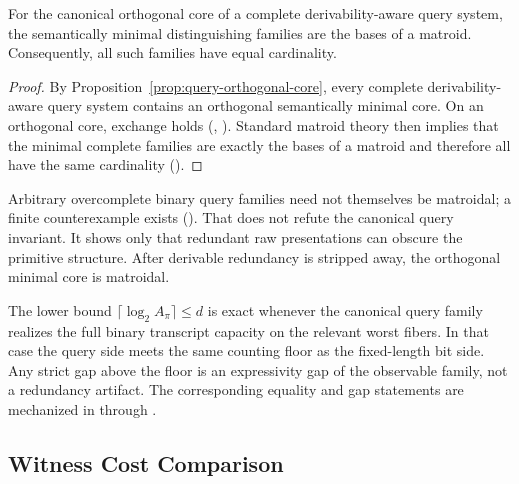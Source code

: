 \begin{theorem}\label{thm:matroid-bases}
For the canonical orthogonal core of a complete derivability-aware query system, the semantically minimal distinguishing families are the bases of a matroid. Consequently, all such families have equal cardinality.
\end{theorem}

\begin{proof}
By Proposition~\ref{prop:query-orthogonal-core}, every complete derivability-aware query system contains an orthogonal semantically minimal core. On an orthogonal core, exchange holds (, ). Standard matroid theory then implies that the minimal complete families are exactly the bases of a matroid and therefore all have the same cardinality ().
\end{proof}

\begin{remark}
Arbitrary overcomplete binary query families need not themselves be matroidal; a finite counterexample exists (). That does not refute the canonical query invariant. It shows only that redundant raw presentations can obscure the primitive structure. After derivable redundancy is stripped away, the orthogonal minimal core is matroidal.
\end{remark}

\begin{remark}
The lower bound $\lceil \log_2 A_{\pi} \rceil \le d$ is exact whenever the canonical query family realizes the full binary transcript capacity on the relevant worst fibers. In that case the query side meets the same counting floor as the fixed-length bit side. Any strict gap above the floor is an expressivity gap of the observable family, not a redundancy artifact. The corresponding equality and gap statements are mechanized in  through .
\end{remark}

\subsection{Witness Cost Comparison}

